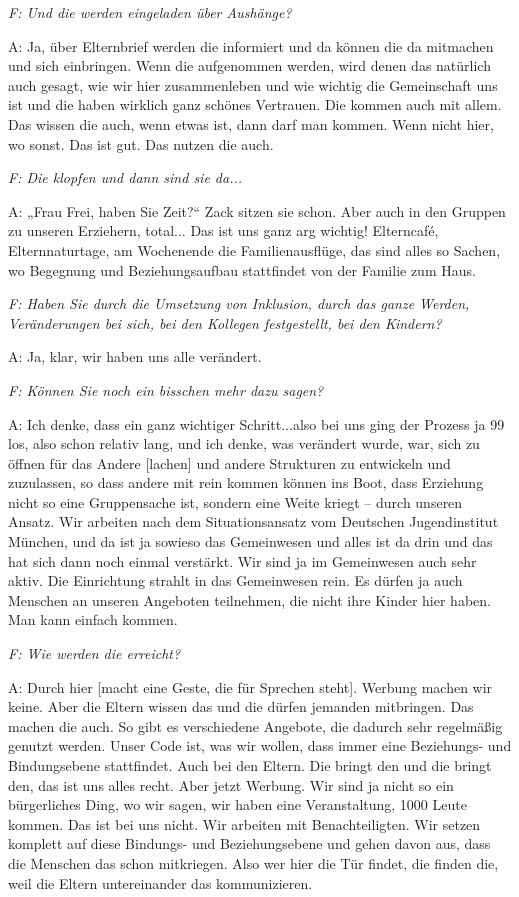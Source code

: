 \begin{linenumbers*}
\emph{F: Und die werden eingeladen über Aushänge?}

A: Ja, über Elternbrief werden die informiert und da können die da mitmachen und sich einbringen.
Wenn die aufgenommen werden, wird denen das natürlich auch gesagt, wie wir hier zusammenleben und wie wichtig die Gemeinschaft uns ist und die haben wirklich ganz schönes Vertrauen. Die kommen auch mit allem. Das wissen die auch, wenn etwas ist, dann darf man kommen. Wenn nicht hier, wo sonst. Das ist gut. Das nutzen die auch. 

\emph{F: Die klopfen und dann sind sie da...}

A: „Frau Frei, haben Sie Zeit?“ Zack sitzen sie schon. Aber auch in den Gruppen zu unseren Erziehern, total... Das ist uns ganz arg wichtig!
Elterncafé, Elternnaturtage, am Wochenende die Familienausflüge, das sind alles so Sachen, wo Begegnung und Beziehungsaufbau stattfindet von der Familie zum Haus.  
 
\emph{F: Haben Sie durch die Umsetzung von Inklusion, durch das ganze Werden, Veränderungen bei sich, bei den Kollegen festgestellt, bei den Kindern?}

A: Ja, klar, wir haben uns alle verändert. 

\emph{F: Können Sie noch ein bisschen mehr dazu sagen?}

A: Ich denke, dass ein ganz wichtiger Schritt...also bei uns ging der Prozess ja 99 los, also schon relativ lang, und ich denke, was verändert wurde, war, sich zu öffnen für das Andere [lachen] und andere Strukturen zu entwickeln und zuzulassen, so dass andere mit rein kommen können ins Boot, dass Erziehung nicht so eine Gruppensache ist, sondern eine Weite kriegt -- durch unseren Ansatz. Wir arbeiten nach dem Situationsansatz vom Deutschen Jugendinstitut München, und da ist ja sowieso das Gemeinwesen und alles ist da drin und das hat sich dann noch einmal verstärkt. Wir sind ja im Gemeinwesen auch sehr aktiv. Die Einrichtung strahlt in das Gemeinwesen rein. Es dürfen ja auch Menschen an unseren Angeboten teilnehmen, die nicht ihre Kinder hier haben. Man kann einfach kommen.

\emph{F: Wie werden die erreicht?}

A: Durch hier [macht eine Geste, die für Sprechen steht]. Werbung machen wir keine. Aber die Eltern wissen das und die dürfen jemanden mitbringen. Das machen die auch. So gibt es verschiedene Angebote, die dadurch sehr regelmäßig genutzt werden. Unser Code ist, was wir wollen, dass immer eine Beziehungs- und Bindungsebene stattfindet. Auch bei den Eltern. Die bringt den und die bringt den, das ist uns alles recht. Aber jetzt Werbung. Wir sind ja nicht so ein bürgerliches Ding, wo wir sagen, wir haben eine Veranstaltung, 1000 Leute kommen. Das ist bei uns nicht. Wir arbeiten mit Benachteiligten. Wir setzen komplett auf diese Bindungs- und Beziehungsebene und gehen davon aus, dass die Menschen das schon mitkriegen. Also wer hier die Tür findet, die finden die, weil die Eltern untereinander das kommunizieren. 


\end{linenumbers*}
